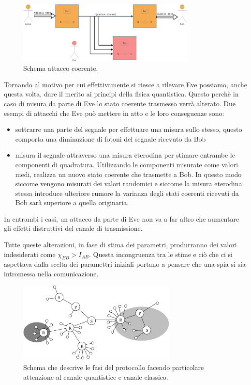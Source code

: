 \begin{itemize}
\begin{figure}[H] 
\begin{center}
\includegraphics[width=0.8\textwidth]{figure/collective_attack.eps} 
\end{center}
\caption{Schema attacco coerente.} \label{fig:attacco-coerente}
\end{figure}
\end{itemize} 

Tornando al motivo per cui effettivamente si riesce a rilevare Eve possiamo, anche questa volta, dare il merito ai principi della fisica quantistica. Questo perch\`e in caso di misura da parte di Eve lo stato coerente trasmesso verr\`a alterato. Due esempi di attacchi che Eve pu\`o mettere in atto e le loro conseguenze sono: 
\begin{itemize}
\item sottrarre una parte del segnale per effettuare una misura sullo stesso, questo comporta una diminuzione di fotoni del segnale ricevuto da Bob
\item misura il segnale attraverso una misura eterodina per stimare entrambe le componenti di quadratura. Utilizzando le componenti misurate come valori medi, realizza un nuovo stato coerente che trasmette a Bob. In questo modo siccome vengono misurati dei valori randomici e siccome la misura eterodina stessa introduce ulteriore rumore la varianza degli stati coerenti ricevuti da Bob sar\`a superiore a quella originaria. 
\end{itemize} 
In entrambi i casi, un attacco da parte di Eve non va a far altro che aumentare gli effetti distruttivi del canale di trasmissione.


Tutte queste alterazioni, in fase di stima dei parametri, produrranno dei valori indesiderati come $\chi_{EB} > I_{AB}$. Questa incongruenza tra le stime e ci\`o che ci si aspettava dalla scelta dei paramettri iniziali portano a pensare che una spia si sia intromessa nella comunicazione. 

\begin{figure}[bht] 
\begin{center}
\includegraphics[width=8cm]{figure/esempio-figura-1.eps} 
\end{center}
\caption{Schema che descrive le fasi del protocollo facendo particolare attenzione al canale quantistice e canale classico.} 
\end{figure}

